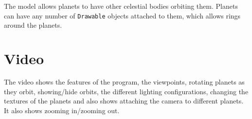 The model allows planets to have other celestial bodies orbiting them. Planets can have any number of \texttt{Drawable} objects attached to them, which allows rings around the planets.

\section{Video} %
\label{sec:video}
The video shows the features of the program, the viewpoints, rotating planets as they orbit, showing/hide orbits, the different lighting configurations, changing the textures of the planets and also shows attaching the camera to different planets. It also shows zooming in/zooming out. 


